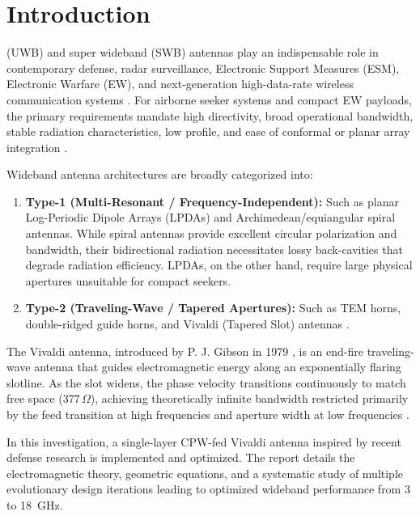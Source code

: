 \documentclass[journal,compsoc,twocolumn,10pt]{IEEEtran}
\begin{document}
\section{Introduction}
 (UWB) and super wideband (SWB) antennas play an indispensable role in contemporary defense, radar surveillance, Electronic Support Measures (ESM), Electronic Warfare (EW), and next-generation high-data-rate wireless communication systems \cite{gibson1979vivaldi, balanis2005antenna}. For airborne seeker systems and compact EW payloads, the primary requirements mandate high directivity, broad operational bandwidth, stable radiation characteristics, low profile, and ease of conformal or planar array integration \cite{joshi2025compact}.

Wideband antenna architectures are broadly categorized into:
\begin{enumerate}
    \item \textbf{Type-1 (Multi-Resonant / Frequency-Independent):} Such as planar Log-Periodic Dipole Arrays (LPDAs) and Archimedean/equiangular spiral antennas. While spiral antennas provide excellent circular polarization and bandwidth, their bidirectional radiation necessitates lossy back-cavities that degrade radiation efficiency. LPDAs, on the other hand, require large physical apertures unsuitable for compact seekers.
    \item \textbf{Type-2 (Traveling-Wave / Tapered Apertures):} Such as TEM horns, double-ridged guide horns, and Vivaldi (Tapered Slot) antennas \cite{paul2021super}.
\end{enumerate}

The Vivaldi antenna, introduced by P. J. Gibson in 1979 \cite{gibson1979vivaldi}, is an end-fire traveling-wave antenna that guides electromagnetic energy along an exponentially flaring slotline. As the slot widens, the phase velocity transitions continuously to match free space ($377\,\Omega$), achieving theoretically infinite bandwidth restricted primarily by the feed transition at high frequencies and aperture width at low frequencies \cite{yazdandoost2004ultra}.

In this investigation, a single-layer CPW-fed Vivaldi antenna inspired by recent defense research \cite{joshi2025compact} is implemented and optimized. The report details the electromagnetic theory, geometric equations, and a systematic study of multiple evolutionary design iterations leading to optimized wideband performance from 3 to 18~GHz.

\end{document}

